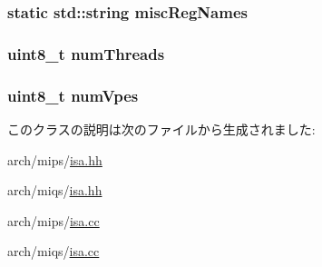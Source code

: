 \label{classMipsISA_1_1ISA_a53b478f356b8709271f5f00b99473458}
\hypertarget{classMipsISA_1_1ISA_a9cdc253c8b6e87a237586ded36ac309f}{
\subsubsection[{miscRegNames}]{\setlength{\rightskip}{0pt plus 5cm}static std::string {\bf miscRegNames}}}
\label{classMipsISA_1_1ISA_a9cdc253c8b6e87a237586ded36ac309f}
\hypertarget{classMipsISA_1_1ISA_aa972a4ac745d8349cf6f90462dfc5433}{
\subsubsection[{numThreads}]{\setlength{\rightskip}{0pt plus 5cm}uint8\_\-t {\bf numThreads}}}
\label{classMipsISA_1_1ISA_aa972a4ac745d8349cf6f90462dfc5433}
\hypertarget{classMipsISA_1_1ISA_a4ee800a76f0f2c6b285bf0881a4b6c1a}{
\subsubsection[{numVpes}]{\setlength{\rightskip}{0pt plus 5cm}uint8\_\-t {\bf numVpes}}}
\label{classMipsISA_1_1ISA_a4ee800a76f0f2c6b285bf0881a4b6c1a}


このクラスの説明は次のファイルから生成されました:\begin{DoxyCompactItemize}
\item 
arch/mips/\hyperlink{mips_2isa_8hh}{isa.hh}\item 
arch/miqs/\hyperlink{miqs_2isa_8hh}{isa.hh}\item 
arch/mips/\hyperlink{mips_2isa_8cc}{isa.cc}\item 
arch/miqs/\hyperlink{miqs_2isa_8cc}{isa.cc}\end{DoxyCompactItemize}
